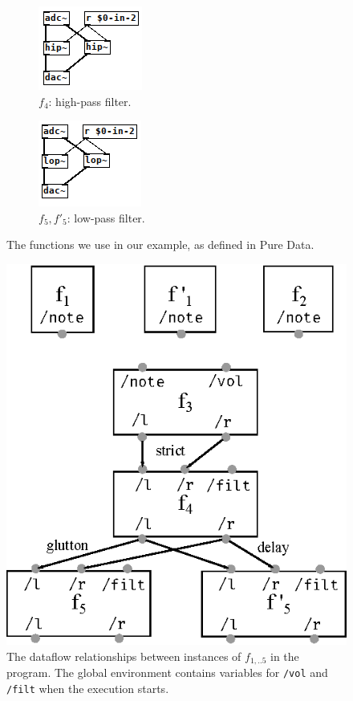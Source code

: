 \documentclass{article}
\begin{document}
\begin{figure}[h]
    \begin{subfigure}{0.21\textwidth}\centering
        \includegraphics[scale=0.5]{images/pd-4.png}
        \caption{$f_4$: high-pass filter.}
    \end{subfigure}
    \begin{subfigure}{0.21\textwidth}\centering
        \includegraphics[scale=0.5]{images/pd-5.png}
        \caption{$f_5, f'_5$: low-pass filter.}
    \end{subfigure}
    \caption{The functions we use in our example, as defined in Pure Data.}
    \label{fig.pdpatches}
\end{figure}


\begin{figure}[h]
    \centering
    \includegraphics[scale=0.7]{images/nodes.eps}
    
    \caption{The dataflow relationships between instances of $f_{1,..5}$ in the program. The global environment contains variables for \lstinline|/vol| and \lstinline|/filt| when the execution starts.}
    \label{fig.datapatch}
\end{figure}
\end{document}
